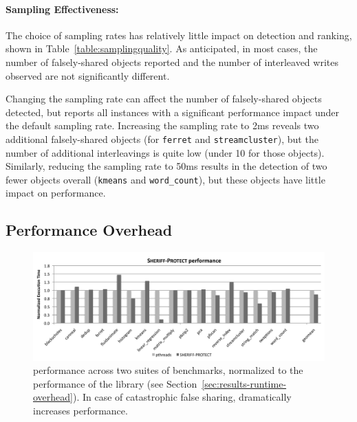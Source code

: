 \paragraph{Sampling Effectiveness:}
The choice of sampling rates has relatively little impact on detection and ranking, shown in Table~\ref{table:samplingquality}. As anticipated, in most cases, the number of falsely-shared objects reported and the number of interleaved writes observed are not significantly different.

Changing the sampling rate can affect the number of falsely-shared objects detected, but \SheriffDetect{} reports all instances with a significant performance impact under the default sampling rate. Increasing the sampling rate to 2ms reveals two additional falsely-shared objects (for \texttt{ferret} and \texttt{streamcluster}), but the number of additional interleavings is quite low (under 10 for those objects). Similarly, reducing the sampling rate to 50ms results in the detection of two fewer objects overall (\texttt{kmeans} and \texttt{word\_count}), but these objects have little impact on performance.


\subsection{\SheriffProtect{} Performance Overhead}
\label{sec:protectperformance}

\begin{figure}[!t]
\centering
\includegraphics[width=5in]{sheriff/figure/patrolperf.pdf}
\caption{\sheriffprotect{} performance across two suites of benchmarks, normalized to the performance of the \pthreads{} library (see Section~\ref{sec:results-runtime-overhead}). In case of catastrophic false sharing, \sheriffdetect{} dramatically increases performance.
\label{fig:patrol}}
\end{figure}

